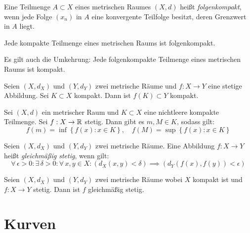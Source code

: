 \documentclass{cheat-sheet}
\begin{document}
\begin{defn}
Eine Teilmenge $A \subset X$ eines metrischen Raumes $(X, d)$ heißt \emph{folgenkompakt}, wenn jede Folge $(x_n)$ in $A$ eine konvergente Teilfolge besitzt, deren Grenzwert in $A$ liegt.
\end{defn}

\begin{satz}
Jede kompakte Teilmenge eines metrischen Raums ist folgenkompakt.
\end{satz}

\begin{bem}
Es gilt auch die Umkehrung: Jede folgenkompakte Teilmenge eines metrischen Raums ist kompakt.
\end{bem}

\begin{satz}
Seien $(X, d_X)$ und $(Y, d_Y)$ zwei metrische Räume und $f : X \to Y$ eine stetige Abbildung. Sei $K \subset X$ kompakt. Dann ist $f(K) \subset Y$ kompakt.
\end{satz}

\begin{satz}
Sei $(X, d)$ ein metrischer Raum und $K \subset X$ eine nichtleere kompakte Teilmenge. Sei $f : X \to \mathbb{R}$ stetig. Dann gibt es $m, M \in K$, sodass gilt:
\[ f(m) = \inf\left\{ f(x) : x \in K \right\},\quad f(M) = \sup\left\{ f(x) : x \in K \right\} \]
\end{satz}

\begin{defn}
Seien $(X, d_X)$ und $(Y, d_Y)$ zwei metrische Räume. Eine Abbildung $f : X \to Y$ heißt \emph{gleichmäßig stetig}, wenn gilt:
\[ \forall\,\epsilon > 0 : \exists\,\delta > 0 : \forall\,x, y \in X : \left(d_X(x, y) < \delta\right) \implies \left( d_Y(f(x), f(y)) < \epsilon \right) \]
\end{defn}

\begin{samepage} %

\begin{satz}
Seien $(X, d_X)$ und $(Y, d_Y)$ zwei metrische Räume wobei $X$ kompakt ist und $f : X \to Y$ stetig. Dann ist $f$ gleichmäßig stetig.
\end{satz}

\section{Kurven}

\end{samepage}
\end{document}
